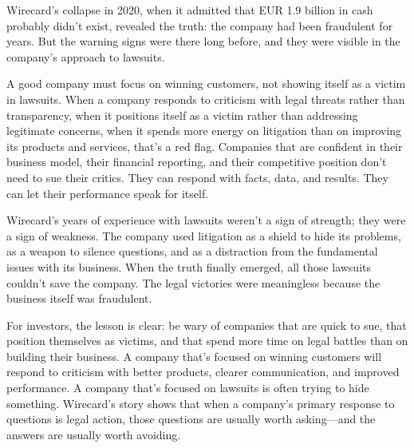 Wirecard's collapse in 2020, when it admitted that EUR 1.9 billion in cash probably didn't exist, revealed the truth: the company had been fraudulent for years. But the warning signs were there long before, and they were visible in the company's approach to lawsuits.

A good company must focus on winning customers, not showing itself as a victim in lawsuits. When a company responds to criticism with legal threats rather than transparency, when it positions itself as a victim rather than addressing legitimate concerns, when it spends more energy on litigation than on improving its products and services, that's a red flag. Companies that are confident in their business model, their financial reporting, and their competitive position don't need to sue their critics. They can respond with facts, data, and results. They can let their performance speak for itself.

Wirecard's years of experience with lawsuits weren't a sign of strength; they were a sign of weakness. The company used litigation as a shield to hide its problems, as a weapon to silence questions, and as a distraction from the fundamental issues with its business. When the truth finally emerged, all those lawsuits couldn't save the company. The legal victories were meaningless because the business itself was fraudulent.

For investors, the lesson is clear: be wary of companies that are quick to sue, that position themselves as victims, and that spend more time on legal battles than on building their business. A company that's focused on winning customers will respond to criticism with better products, clearer communication, and improved performance. A company that's focused on lawsuits is often trying to hide something. Wirecard's story shows that when a company's primary response to questions is legal action, those questions are usually worth asking—and the answers are usually worth avoiding.

